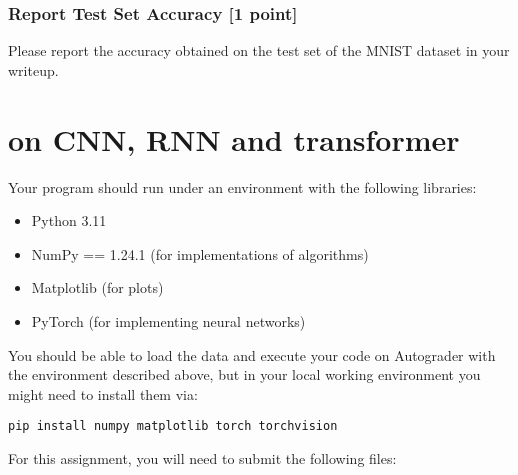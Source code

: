 \documentclass[lang=cn,11pt]{elegantbook}
\begin{document}
\subsection*{Report Test Set Accuracy [1 point]}
Please report the accuracy obtained on the test set of the MNIST dataset in your writeup.
\begin{solution}
\end{solution}




\chapter{on CNN, RNN and transformer}


Your program should run under an environment with the following libraries:
\begin{itemize}
    \item Python 3.11
    \item NumPy == 1.24.1 (for implementations of algorithms)
    \item Matplotlib (for plots)
    \item PyTorch (for implementing neural networks)
\end{itemize}
You should be able to load the data and execute your code on Autograder with the environment described above, but in your local working environment you might need to install them via:
\begin{verbatim}
pip install numpy matplotlib torch torchvision
\end{verbatim}
For this assignment, you will need to submit the following files:
\end{document}
